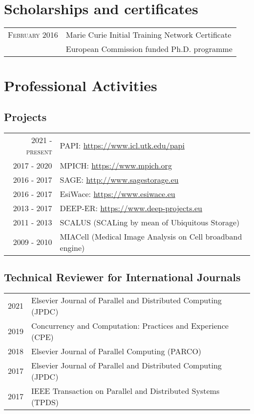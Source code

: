 \documentclass[a4paper,10pt]{article}
\begin{document}
\section{Scholarships and certificates}
\begin{tabular}{rp{11cm}}
\textsc{February} 2016 & Marie Curie Initial Training Network Certificate \\
          & \footnotesize{European Commission funded Ph.D. programme}
\end{tabular}

\section{Professional Activities}
\subsection*{Projects}
\begin{tabular}{rp{11cm}}
\textsc{2021 - present} & PAPI: \url{https://www.icl.utk.edu/papi} \\
\textsc{2017 - 2020}    & MPICH: \url{https://www.mpich.org} \\
\textsc{2016 - 2017}    & SAGE: \url{http://www.sagestorage.eu} \\
\textsc{2016 - 2017}    & EsiWace: \url{https://www.esiwace.eu} \\
\textsc{2013 - 2017}    & DEEP-ER: \url{https://www.deep-projects.eu} \\
\textsc{2011 - 2013}    & SCALUS (SCALing by mean of Ubiquitous Storage) \\
\textsc{2009 - 2010}    & MIACell (Medical Image Analysis on Cell broadband engine) \\
\end{tabular}

\subsection*{Technical Reviewer for International Journals}
\begin{tabular}{rp{11cm}}
    2021 & Elsevier Journal of Parallel and Distributed Computing (JPDC) \\
    2019 & Concurrency and Computation: Practices and Experience (CPE) \\
    2018 & Elsevier Journal of Parallel Computing (PARCO) \\
    2017 & Elsevier Journal of Parallel and Distributed Computing (JPDC)\\
    2017 & IEEE Transaction on Parallel and Distributed Systems (TPDS)\\
\end{tabular}
\end{document}
